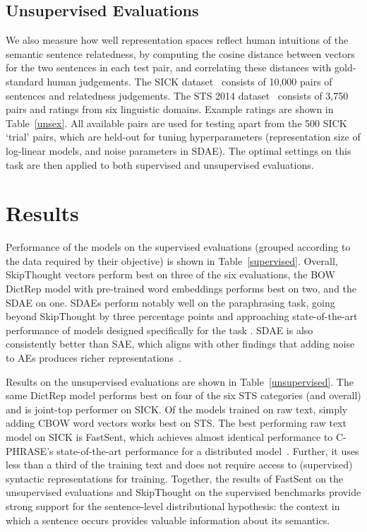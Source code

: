 \documentclass[11pt,letterpaper]{article}
\begin{document}
\subsection{Unsupervised Evaluations}
\label{unseval}
We also measure how well representation spaces reflect human intuitions of the semantic sentence relatedness, by computing the cosine distance between vectors for the two sentences in each test pair, and correlating these distances with gold-standard human judgements. The SICK dataset~\cite{marelli2014sick} consists of 10,000 pairs of sentences and relatedness judgements. The STS 2014 dataset~\cite{agirre2014semeval} consists of 3,750 pairs and ratings from six linguistic domains. Example ratings are shown in Table~\ref{unsex}. All available pairs are used for testing apart from the 500 SICK `trial' pairs, which are held-out for tuning hyperparameters (representation size of log-linear models, and noise parameters in SDAE). The optimal settings on this task are then applied to both supervised and unsupervised evaluations.  



\section{Results}

Performance of the models on the supervised evaluations (grouped according to the data required by their objective) is shown in Table~\ref{supervised}. Overall, SkipThought vectors perform best on three of the six evaluations, the BOW DictRep model with pre-trained word embeddings performs best on two, and the SDAE on one. SDAEs perform notably well on the paraphrasing task, going beyond SkipThought by three percentage points and approaching state-of-the-art performance of models designed specifically for the task \cite{ji2013discriminative}. SDAE is also consistently better than SAE, which aligns with other findings that adding noise to AEs produces richer representations~\cite{vincent2008extracting}.  

Results on the unsupervised evaluations are shown in Table~\ref{unsupervised}. The same DictRep model performs best on four of the six STS categories (and overall) and is joint-top performer on SICK. Of the models trained on raw text, simply adding CBOW word vectors works best on STS. The best performing raw text model on SICK is FastSent, which achieves almost identical performance to C-PHRASE's state-of-the-art performance for a distributed model~\cite{marcobaronijointly}. Further, it uses less than a third of the training text and does not require access to (supervised) syntactic representations for training. Together, the results of FastSent on the unsupervised evaluations and SkipThought on the supervised benchmarks provide strong support for the sentence-level distributional hypothesis: the context in which a sentence occurs provides valuable  information about its semantics.
\end{document}
